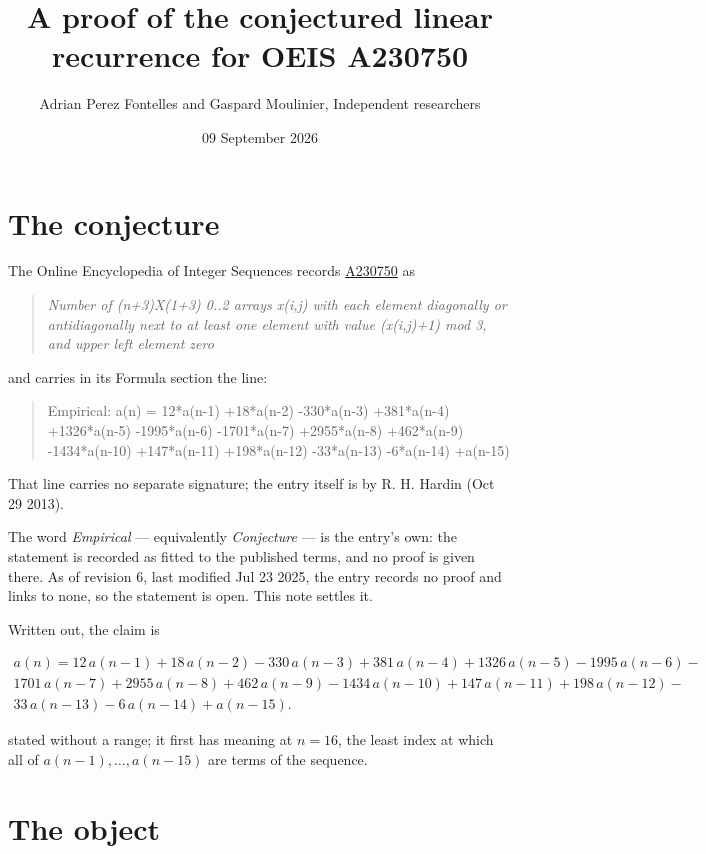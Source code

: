 \documentclass[11pt]{article}
\title{A proof of the conjectured linear recurrence for OEIS A230750}
\author{Adrian Perez Fontelles and Gaspard Moulinier, Independent researchers}
\date{09 September 2026}
\theoremstyle{definition}
\begin{document}
\maketitle
\section{The conjecture}

The Online Encyclopedia of Integer Sequences records \href{https://oeis.org/A230750}{A230750} as

\begin{quote}\itshape Number of (n+3)X(1+3) 0..2 arrays x(i,j) with each element diagonally or antidiagonally next to at least one element with value (x(i,j)+1) mod 3, and upper left element zero\end{quote}

and carries in its Formula section the line:

\begin{quote}\ttfamily Empirical: a(n) = 12*a(n-1) +18*a(n-2) -330*a(n-3) +381*a(n-4) +1326*a(n-5) -1995*a(n-6) -1701*a(n-7) +2955*a(n-8) +462*a(n-9) -1434*a(n-10) +147*a(n-11) +198*a(n-12) -33*a(n-13) -6*a(n-14) +a(n-15)\end{quote}

That line carries no separate signature; the entry itself is by R. H. Hardin (Oct 29 2013).

The word {\itshape Empirical} --- equivalently {\itshape Conjecture} --- is the entry's own: the statement is recorded as fitted to the published terms, and no proof is given there. As of revision 6, last modified Jul 23 2025, the entry records no proof and links to none, so the statement is open. This note settles it.

Written out, the claim is

\begin{multline*} a(n) = 12\,a(n-1) + 18\,a(n-2) - 330\,a(n-3) + 381\,a(n-4) + 1326\,a(n-5) - 1995\,a(n-6) - \\ 1701\,a(n-7) + 2955\,a(n-8) + 462\,a(n-9) - 1434\,a(n-10) + 147\,a(n-11) + 198\,a(n-12) - \\ 33\,a(n-13) - 6\,a(n-14) + a(n-15). \end{multline*}

stated without a range; it first has meaning at $n = 16$, the least index at which all of $a(n-1),\dots,a(n-15)$ are terms of the sequence.

\section{The object}
\end{document}
